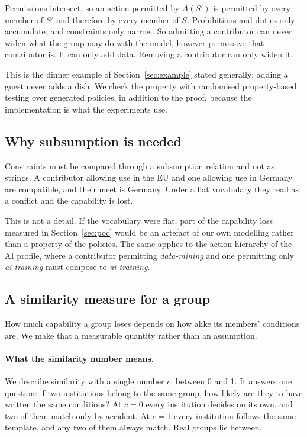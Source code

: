 \documentclass[sigconf,anonymous,review]{acmart}
\begin{document}
Permissions intersect, so an action permitted by $A(S')$ is permitted by every
member of $S'$ and therefore by every member of $S$. Prohibitions and duties only
accumulate, and constraints only narrow. So admitting a contributor can never
widen what the group may do with the model, however permissive that contributor
is. It can only add data. Removing a contributor can only widen it.

This is the dinner example of Section~\ref{sec:example} stated generally: adding a
guest never adds a dish. We check the property with randomised property-based
testing over generated policies, in addition to the proof, because the
implementation is what the experiments use.

\subsection{Why subsumption is needed}

Constraints must be compared through a subsumption relation and not as strings. A
contributor allowing use in the EU and one allowing use in Germany are
compatible, and their meet is Germany. Under a flat vocabulary they read as a
conflict and the capability is lost.

This is not a detail. If the vocabulary were flat, part of the capability loss
measured in Section~\ref{sec:poc} would be an artefact of our own modelling
rather than a property of the policies. The same applies to the action hierarchy
of the AI profile, where a contributor permitting \emph{data-mining} and one
permitting only \emph{ai-training} must compose to \emph{ai-training}.

\subsection{A similarity measure for a group}
\label{sec:similarity}

How much capability a group loses depends on how alike its members' conditions
are. We make that a measurable quantity rather than an assumption.

\paragraph{What the similarity number means.} We describe similarity with a
single number $c$, between 0 and 1. It answers one question: if two institutions
belong to the same group, how likely are they to have written the same
conditions? At $c=0$ every institution decides on its own, and two of them match
only by accident. At $c=1$ every institution follows the same template, and any
two of them always match. Real groups lie between.
\end{document}
